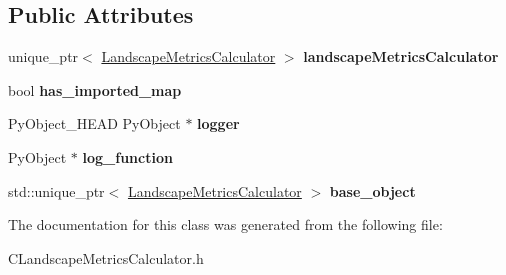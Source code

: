 \subsection*{Public Attributes}
\begin{DoxyCompactItemize}
\item 
unique\+\_\+ptr$<$ \hyperlink{class_landscape_metrics_calculator}{Landscape\+Metrics\+Calculator} $>$ {\bfseries landscape\+Metrics\+Calculator}\hypertarget{class_py_l_m_c_a7d524fa3a2eca7349d66ae8fa766670f}{}\label{class_py_l_m_c_a7d524fa3a2eca7349d66ae8fa766670f}

\item 
bool {\bfseries has\+\_\+imported\+\_\+map}\hypertarget{class_py_l_m_c_a282bf8674cb032dc0f010e037ac393c9}{}\label{class_py_l_m_c_a282bf8674cb032dc0f010e037ac393c9}

\item 
Py\+Object\+\_\+\+H\+E\+AD Py\+Object $\ast$ {\bfseries logger}\hypertarget{class_py_template_a5b741a472639d65f9bcad29afa16ec99}{}\label{class_py_template_a5b741a472639d65f9bcad29afa16ec99}

\item 
Py\+Object $\ast$ {\bfseries log\+\_\+function}\hypertarget{class_py_template_a98bb8152faa73d028342d5cf260f0372}{}\label{class_py_template_a98bb8152faa73d028342d5cf260f0372}

\item 
std\+::unique\+\_\+ptr$<$ \hyperlink{class_landscape_metrics_calculator}{Landscape\+Metrics\+Calculator} $>$ {\bfseries base\+\_\+object}\hypertarget{class_py_template_abcd20aea11103e6764f38cf5ed4085ca}{}\label{class_py_template_abcd20aea11103e6764f38cf5ed4085ca}

\end{DoxyCompactItemize}


The documentation for this class was generated from the following file\+:\begin{DoxyCompactItemize}
\item 
C\+Landscape\+Metrics\+Calculator.\+h\end{DoxyCompactItemize}
